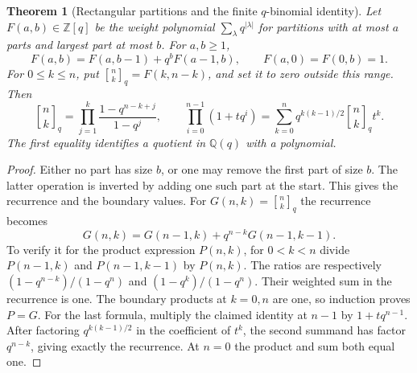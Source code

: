 \documentclass[11pt,oneside,openany]{book}
\newcommand{\bracketbinom}[2]{\genfrac{[}{]}{0pt}{}{#1}{#2}}
\theoremstyle{plain}
\newtheorem{theorem}{Theorem}[chapter]
\theoremstyle{definition}
\theoremstyle{remark}
\begin{document}
\begin{theorem}[Rectangular partitions and the finite \(q\)-binomial identity]
\label{p204:W28}
Let \(F(a,b)\in\mathbb Z[q]\) be the weight polynomial
\(\sum_\lambda q^{|\lambda|}\) for partitions with at most \(a\)
parts and largest part at most \(b\). For \(a,b\ge1\),
\[
 F(a,b)=F(a,b-1)+q^b F(a-1,b),\qquad
 F(a,0)=F(0,b)=1.
\]
For \(0\le k\le n\), put \(\bracketbinom{n}{k}_q=F(k,n-k)\), and set it
to zero outside this range. Then
\[
 \bracketbinom{n}{k}_q=\prod_{j=1}^k\frac{1-q^{n-k+j}}{1-q^j},
 \qquad
 \prod_{i=0}^{n-1}(1+tq^i)=
     \sum_{k=0}^n q^{k(k-1)/2}\bracketbinom{n}{k}_q t^k .
\]
The first equality identifies a quotient in \(\mathbb Q(q)\)
with a polynomial.
\end{theorem}
\begin{proof}
Either no part has size \(b\), or one may remove the first
part of size \(b\). The latter operation is inverted by adding
one such part at the start. This gives the recurrence and the
boundary values. For \(G(n,k)=\bracketbinom{n}{k}_q\) the recurrence
becomes
\[
 G(n,k)=G(n-1,k)+q^{n-k}G(n-1,k-1).
\]
To verify it for the product expression \(P(n,k)\), for
\(0<k<n\) divide \(P(n-1,k)\) and \(P(n-1,k-1)\) by \(P(n,k)\).
The ratios are respectively
\((1-q^{n-k})/(1-q^n)\) and \((1-q^k)/(1-q^n)\).
Their weighted sum in the recurrence is one. The boundary
products at \(k=0,n\) are one, so induction proves \(P=G\).
For the last formula, multiply the claimed identity at \(n-1\)
by \(1+tq^{n-1}\). After factoring \(q^{k(k-1)/2}\) in
the coefficient of \(t^k\), the second summand has factor
\(q^{n-k}\), giving exactly the recurrence. At \(n=0\)
the product and sum both equal one.
\end{proof}
\end{document}
